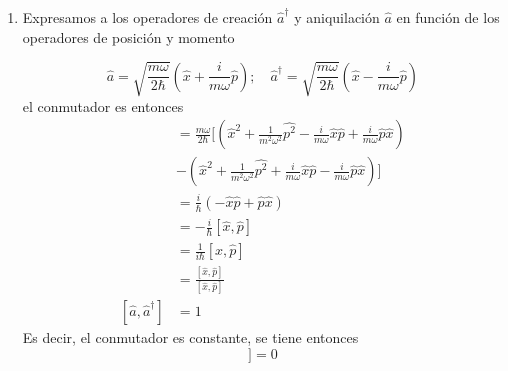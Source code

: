 \setcounter{equation}{0}

\begin{enumerate}
  \item Expresamos a los operadores de creación $\hat{a}^\dagger$ y aniquilación $\hat{a}$ en función de los operadores de posición y momento

        \begin{equation*}
          \hat{a} = \sqrt{\frac{m\omega}{2\hbar}}\left( \hat{x} + \frac{i}{m\omega}\hat{p} \right); \quad \hat{a}^\dagger = \sqrt{\frac{m\omega}{2\hbar}}\left( \hat{x} - \frac{i}{m\omega}\hat{p} \right)
        \end{equation*}
        el conmutador es entonces
        \begin{align*}
          [\hat{a}, \hat{a}^\dagger] & = \frac{m\omega}{2\hbar} \Bigg[ \left( \hat{x}^2 + \frac{1}{m^2\omega^2}\hat{p^2} - \frac{i}{m\omega}\hat{x}\hat{p} + \frac{i}{m\omega}\hat{p}\hat{x} \right) \\ &- \left( \hat{x}^2 + \frac{1}{m^2\omega^2}\hat{p^2} + \frac{i}{m\omega}\hat{x}\hat{p} - \frac{i}{m\omega}\hat{p}\hat{x} \right) \Bigg] \\
                                     & = \frac{i}{\hbar}\left(-\hat{x}\hat{p} + \hat{p}\hat{x}\right)                                                                                                \\
                                     & = -\frac{i}{\hbar}[\hat{x}, \hat{p}]                                                                                                                          \\
                                     & = \frac{1}{i\hbar}[\hat{x}, \hat{p}]                                                                                                                          \\
                                     & = \frac{[\hat{x}, \hat{p}]}{[\hat{x}, \hat{p}]}                                                                                                               \\
          [\hat{a}, \hat{a}^\dagger] & = 1
        \end{align*}
        Es decir, el conmutador es constante, se tiene entonces
        \begin{equation*}
          [\hat{A}, [\hat{a}, \hat{a}^{\dagger}]] = 0
        \end{equation*}


\end{enumerate}
